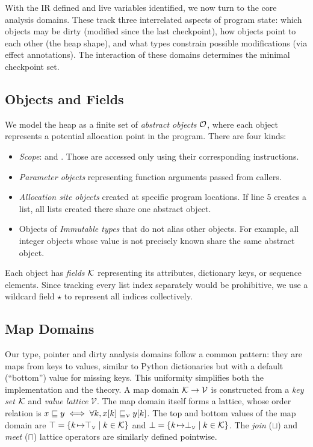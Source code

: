 With the IR defined and live variables identified, we now turn to the core analysis domains. These track three interrelated aspects of program state: which objects may be dirty (modified since the last checkpoint), how objects point to each other (the heap shape), and what types constrain possible modifications (via effect annotations). The interaction of these domains determines the minimal checkpoint set.

\subsection{Objects and Fields}
We model the heap as a finite set of \emph{abstract objects} $\mathcal{O}$, where each object represents a potential allocation point in the program. There are four kinds:
\begin{itemize}
    \item \emph{Scope}: \tLOCALS and \tGLOBALS. Those are accessed only using their corresponding instructions.
    \item \emph{Parameter objects} representing function arguments passed from callers.
    \item \emph{Allocation site objects} created at specific program locations. If line 5 creates a list, all lists created there share one abstract object.
    \item Objects of \emph{Immutable types} that do not alias other objects. For example, all integer objects whose value is not precisely known share the same abstract object.
\end{itemize}
Each object has \emph{fields} $\mathcal{K}$ representing its attributes, dictionary keys, or sequence elements. Since tracking every list index separately would be prohibitive, we use a wildcard field $\star$ to represent all indices collectively.

\subsection{Map Domains}
Our type, pointer and dirty analysis domains follow a common pattern: they are maps from keys to values, similar to Python dictionaries but with a default (``bottom'') value for missing keys. This uniformity simplifies both the implementation and the theory.
A map domain $\mathcal{K}\to\mathcal{V}$ is constructed from a \emph{key set} $\mathcal{K}$ and \emph{value lattice} $\mathcal{V}$.
The map domain itself forms a lattice, whose order relation is 
$x\sqsubseteq y \iff \forall k,x[k]\sqsubseteq_{\scriptscriptstyle\mathcal{V}}y[k]$.
The top and bottom values of the map domain are
$\top=\{k{\hspace{1pt}\mapsto}\top_{\scriptscriptstyle\mathcal{V}}\mid k\in\mathcal{K}\}$
and
$\bot=\{k{\hspace{1pt}\mapsto}\bot_{\scriptscriptstyle\mathcal{V}}\mid k\in\mathcal{K}\}$.
The \emph{join} ($\sqcup$) and \emph{meet} ($\sqcap$) lattice operators are similarly defined pointwise.

